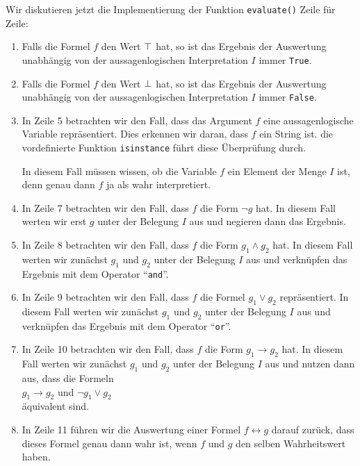 \noindent
Wir diskutieren jetzt die Implementierung der Funktion \texttt{evaluate()} Zeile für
Zeile:
\begin{enumerate}
\item Falls die Formel $f$ den Wert $\top$ hat, so ist das Ergebnis der Auswertung unabhängig von der
      aussagenlogischen Interpretation $I$ immer \texttt{True}. 
\item Falls die Formel $f$ den Wert $\bot$ hat, so ist das Ergebnis der
      Auswertung unabhängig von der aussagenlogischen Interpretation $I$ immer \texttt{False}.
\item In Zeile 5 betrachten wir den Fall, dass das Argument $f$ eine aussagenlogische
      Variable repräsentiert.  Dies erkennen wir daran, dass $f$ ein String ist.
      die vordefinierte Funktion \texttt{isinstance} führt diese Überprüfung durch.

      In diesem Fall müssen wissen, ob die Variable $f$ ein Element der Menge $I$ ist, denn genau dann
      $f$ ja als wahr interpretiert.
\item In Zeile 7 betrachten wir den Fall, dass $f$ die Form $\neg g$  hat.
      In diesem Fall werten wir erst $g$ unter der Belegung $I$ aus und negieren dann das Ergebnis.
\item In Zeile 8 betrachten wir den Fall, dass $f$ die Form 
      $g_1 \wedge g_2$ hat.
      In diesem Fall werten wir zunächst $g_1$ und $g_2$ unter der Belegung $I$ 
      aus und verknüpfen  das Ergebnis mit dem Operator ``\texttt{and}''.
\item In Zeile 9 betrachten wir den Fall, dass $f$ die Formel $g_1 \vee g_2$ repräsentiert.
      In diesem Fall werten wir zunächst $g_1$ und $g_2$ unter der Belegung $I$ 
      aus und verknüpfen  das Ergebnis mit dem Operator ``\texttt{or}''.
\item In Zeile 10 betrachten wir den Fall, dass $f$ die Form $g_1 \rightarrow g_2$ hat.
      In diesem Fall werten wir zunächst $g_1$ und $g_2$ unter der Belegung $I$ 
      aus und nutzen dann aus, dass die Formeln
      \\[0.2cm]
      \hspace*{1.3cm}
      $g_1 \rightarrow g_2$ \quad und \quad $\neg g_1 \vee g_2$
      \\[0.2cm]
      äquivalent sind.
\item In Zeile 11 führen wir die Auswertung einer Formel $f \leftrightarrow g$ darauf zurück, dass dieses
      Formel genau dann wahr ist, wenn $f$ und $g$ den selben Wahrheitswert haben.
\end{enumerate}


